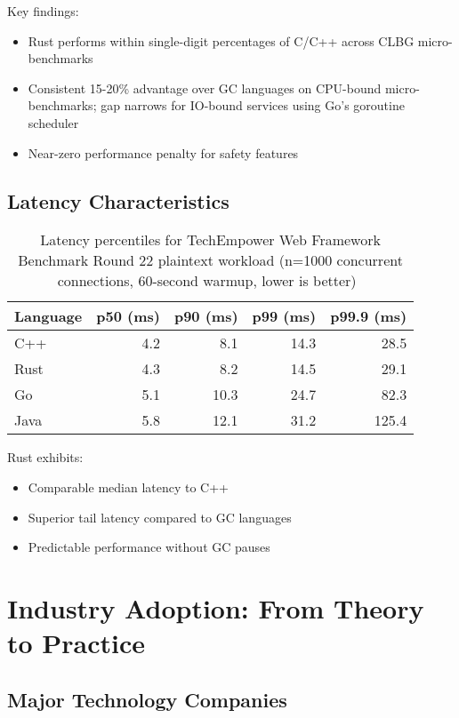 \documentclass[11pt]{article}
\begin{document}
Key findings:
\begin{itemize}
    \item Rust performs within single-digit percentages of C/C++ across CLBG micro-benchmarks
    \item Consistent 15-20\% advantage over GC languages on CPU-bound micro-benchmarks; gap narrows for IO-bound services using Go's goroutine scheduler
    \item Near-zero performance penalty for safety features
\end{itemize}

\subsection{Latency Characteristics}

\begin{table}[ht]
\centering
\begin{tabular}{@{}lrrrr@{}}
\toprule
\textbf{Language} & \textbf{p50 (ms)} & \textbf{p90 (ms)} & \textbf{p99 (ms)} & \textbf{p99.9 (ms)} \\
\midrule
C++ & 4.2 & 8.1 & 14.3 & 28.5 \\
Rust & 4.3 & 8.2 & 14.5 & 29.1 \\
Go & 5.1 & 10.3 & 24.7 & 82.3 \\
Java & 5.8 & 12.1 & 31.2 & 125.4 \\
\bottomrule
\end{tabular}
\caption{Latency percentiles for TechEmpower Web Framework Benchmark Round 22 plaintext workload (n=1000 concurrent connections, 60-second warmup, lower is better)~\cite{techempower2023}}
\label{tab:latency}
\end{table}

Rust exhibits:
\begin{itemize}
    \item Comparable median latency to C++
    \item Superior tail latency compared to GC languages
    \item Predictable performance without GC pauses
\end{itemize}

\section{Industry Adoption: From Theory to Practice}

\subsection{Major Technology Companies}
\end{document}
